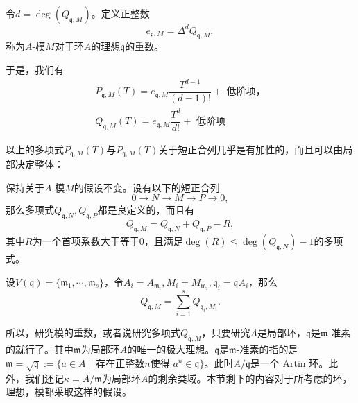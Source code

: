 \begin{definition}
令$d = \deg(Q_{\mathfrak{q},M})$。定义正整数
\begin{equation} \label{eq: multiplicity of a module}
e_{\mathfrak{q},M} = \Delta^d Q_{\mathfrak{q},M},
\end{equation}
称为$A$-模$M$对于环$A$的理想$\mathfrak{q}$的重数。
\end{definition}
于是，我们有
\begin{gather}
P_{\mathfrak{q},M}(T) = e_{\mathfrak{q},M}\dfrac{T^{d-1}}{(d-1)!} + \text{ 低阶项，} \\
Q_{\mathfrak{q},M}(T) = e_{\mathfrak{q},M}\dfrac{T^{d}}{d!} + \text{ 低阶项}
\end{gather}

以上的多项式$P_{\mathfrak{q},M}(T)$与$P_{\mathfrak{q},M}(T)$关于短正合列几乎是有加性的，而且可以由局部决定整体：
\begin{proposition}
\label{almost additivity of hilbert polyn}
保持关于$A$-模$M$的假设不变。设有以下的短正合列
\[0\longrightarrow N \longrightarrow M\longrightarrow P \longrightarrow 0,\]
那么多项式$Q_{\mathfrak{q},N}, Q_{\mathfrak{q},P}$都是良定义的，而且有
\begin{equation}
Q_{\mathfrak{q},M} = Q_{\mathfrak{q},N} + Q_{\mathfrak{q},P} - R,
\end{equation}
其中$R$为一个首项系数大于等于$0$，且满足$\deg(R) \leqslant \deg(Q_{\mathfrak{q},N}) - 1$的多项式。
\end{proposition}

\begin{proposition}
\label{local multiplicity to global}
设$V(\mathfrak{q}) = \{\mathfrak{m}_1, \cdots, \mathfrak{m}_s\}$，令$A_i = A_{\mathfrak{m}_i}, M_i = M_{\mathfrak{m}_i}, \mathfrak{q}_i = \mathfrak{q}A_i$，那么
\begin{equation}
Q_{\mathfrak{q},M} = \sum\limits_{i=1}^s Q_{\mathfrak{q}_i,M_i}.
\end{equation}
\end{proposition}

所以，研究模的重数，或者说研究多项式$Q_{\mathfrak{q},M}$，只要研究$A$是局部环，$\mathfrak{q}$是$\mathfrak{m}$-准素的就行了。其中$\mathfrak{m}$为局部环$A$的唯一的极大理想。$\mathfrak{q}$是$\mathfrak{m}$-准素的指的是$\mathfrak{m} = \sqrt{\mathfrak{q}} := \{ a \in A \ |\ \text{ 存在正整数$n$使得 } a^n\in \mathfrak{q} \}$。此时$A/\mathfrak{q}$是一个 Artin 环。此外，我们还记$\kappa = A / \mathfrak{m}$为局部环$A$的剩余类域。本节剩下的内容对于所考虑的环，理想，模都采取这样的假设。

